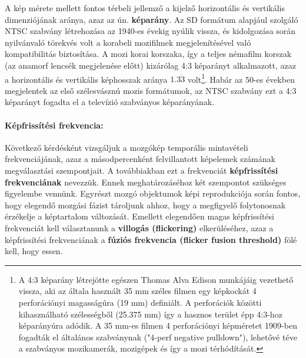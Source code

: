 A kép mérete mellett fontos térbeli jellemző a kijelző horizontális és vertikális dimenziójának aránya, azaz az ún. \textbf{képarány}.
Az SD formátum alapjául szolgáló NTSC szabvány létrehozása az 1940-es évekig nyúlik vissza, és kidolgozása során nyilvánvaló törekvés volt a korabeli mozifilmek megjelenítésével való kompatibilitás biztosítása.
A mozi korai korszaka, így a teljes némafilm korszak (az anamorf lencsék megjelenése előtt) kizárólag 4:3 képarányt alkalmazott, azaz a horizontális és vertikális képhosszak aránya $1.3\dot{3}$ volt\footnote{A 4:3 képarány létrejötte egészen Thomas Alva Edison munkájáig vezethető vissza, aki az általa használt 35 mm széles filmen egy képkockát 4 perforációnyi magasságúra (19 mm) definiált. 
A perforációk közötti kihasználható szélességből (25.375 mm) így a hasznos terület épp 4:3-hoz képarányúra adódik. 
A 35 mm-es filmen 4 perforációnyi képméretet 1909-ben fogadták el általános szabványnak ("4-perf negative pulldown"), lehetővé téve a szabványos mozikamerák, mozigépek és így a mozi térhódítását.}.
Habár az 50-es években megjelentek az első szélesvásznú mozis formátumok, az NTSC szabvány ezt a 4:3 képarányt fogadta el a televízió szabványos képarányának.

\paragraph{Képfrissítési frekvencia:\\}

Következő kérdésként vizsgáljuk a mozgókép temporális mintavételi frekvenciájának, azaz a másodpercenként felvillantott képelemek számának megválasztási szempontjait.
A továbbiakban ezt a frekvenciát \textbf{képfrissítési frekvenciának} nevezzük.
Ennek meghatározáséhoz két szempontot szükséges figyelembe vennünk.
Egyrészt mozgó objektumok képi reprodukciója során fontos, hogy elegendő mozgási fázist tároljunk ahhoz, hogy a megfigyelő folytonosnak érzékelje a képtartalom változását.
Emellett elegendően magas képfrissítési frekvenciát kell választanunk a \textbf{villogás (flickering)} elkerüléséhez, azaz a képfrissítési frekvenciának a \textbf{fúziós frekvencia (flicker fusion threshold)} fölé kell, hogy essen.

